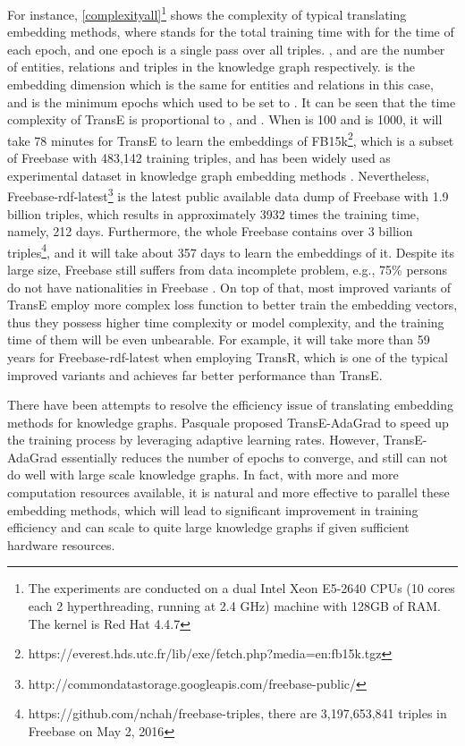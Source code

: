 \documentclass[sigconf]{acmart}
\begin{document}
For instance, \tablename \ref{complexityall}\footnote{The experiments are conducted on a dual Intel Xeon E5-2640 CPUs (10 cores each  2 hyperthreading, running at 2.4 GHz) machine with 128GB of RAM. The kernel is Red Hat 4.4.7} shows the complexity of typical translating embedding methods,  
where  stands for the total training time with  for the time of each epoch, and one epoch is a single pass over all triples. 
,  and  are the number of entities, relations and triples in  the knowledge graph respectively.  is the embedding dimension which is the same for entities and relations in this case, and   is the minimum epochs which used to be set to . It can be seen that the time complexity of TransE is proportional to ,  and .
When  is 100 and  is 1000, it will take 78 minutes for TransE to learn the embeddings of FB15k\footnote{https://everest.hds.utc.fr/lib/exe/fetch.php?media=en:fb15k.tgz}, which is a subset of Freebase with 483,142 training triples, and has been widely used as experimental dataset in knowledge graph embedding methods \cite{bordes2013translating,Wang2014Knowledge,Lin2015Learning,jia2016locally}. Nevertheless, Freebase-rdf-latest\footnote{http://commondatastorage.googleapis.com/freebase-public/ } is the latest public available data dump of Freebase with 1.9 billion triples, which results in approximately 3932 times the training time, namely, 212 days. Furthermore, the whole Freebase contains over 3 billion triples\footnote{https://github.com/nchah/freebase-triples, there are 3,197,653,841 triples in Freebase on May 2, 2016}, and it will take about 357 days to learn the embeddings of it.
Despite its large size, Freebase still suffers from data incomplete problem, e.g., 75\% persons do not have nationalities in Freebase \cite{Dong2014Knowledge}. On top of that, most improved variants of TransE employ more complex loss function to better train the embedding vectors, thus they possess higher time complexity or model complexity, and the training time of them will be even unbearable. For example, it will take more than 59 years for Freebase-rdf-latest when employing TransR, which is one of the typical improved variants and achieves far better performance than TransE.











There have been attempts to resolve the efficiency issue of translating embedding methods for knowledge graphs. 
Pasquale\cite{minervini2015efficient} proposed TransE-AdaGrad 
 to speed up the training process by leveraging adaptive learning rates. 
However, TransE-AdaGrad essentially reduces the number of epochs to converge, and still can not do well with large scale knowledge graphs.
In fact, with more and more computation resources available, 
it is natural and more effective to parallel these embedding methods, which will lead to significant improvement in training efficiency and can scale to quite large knowledge graphs if given sufficient hardware resources. 
\end{document}
